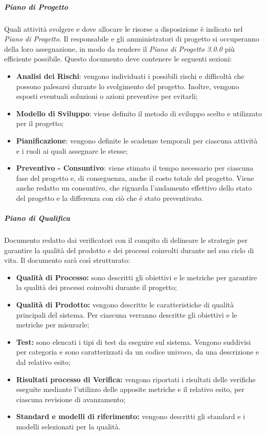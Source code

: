 \subparagraph*{Piano di Progetto\doc}
Quali attività svolgere e dove allocare le risorse a disposizione è indicato nel \textit{Piano di Progetto}\docs. Il responsabile e gli amministratori di progetto si occuperanno della loro assegnazione, in modo da rendere il \textit{Piano di Progetto 3.0.0\doc} più efficiente possibile. Questo documento deve contenere le seguenti sezioni:
\begin{itemize}
	\item \textbf{Analisi dei Rischi}: vengono individuati i possibili rischi e difficoltà che possono palesarsi durante lo svolgimento del progetto. Inoltre, vengono esposti eventuali soluzioni o azioni preventive per evitarli;
	\item \textbf{Modello di Sviluppo}: viene definito il metodo di sviluppo scelto e utilizzato per il progetto;
	\item \textbf{Pianificazione}: vengono definite le scadenze temporali per ciascuna attività e i ruoli ai quali assegnare le stesse;
	\item \textbf{Preventivo - Consuntivo}: viene stimato il tempo necessario per ciascuna fase del progetto e, di conseguenza, anche il costo totale del progetto. Viene anche redatto un consuntivo, che riguarda l'andamento effettivo dello stato del progetto e la differenza con ciò che é stato preventivato.
\end{itemize}
\subparagraph*{Piano di Qualifica}
Documento redatto dai verificatori con il compito di delineare le strategie per garantire la qualità del prodotto e dei processi coinvolti durante nel suo ciclo di vita. Il documento sarà così strutturato:
\begin{itemize}
	\item \textbf{Qualità di Processo:} sono descritti gli obiettivi e le metriche per garantire la qualità dei processi coinvolti durante il progetto;
	\item \textbf{Qualità di Prodotto:} vengono descritte le caratteristiche di qualità principali del sistema. Per ciascuna verranno descritte gli obiettivi e le metriche per misurarle;
	\item \textbf{Test:} sono elencati i tipi di test da eseguire sul sistema. Vengono suddivisi per categoria e sono caratterizzati da un codice univoco, da una descrizione e dal relativo esito;
	\item \textbf{Risultati processo di Verifica:} vengono riportati i risultati delle verifiche eseguite mediante l'utilizzo delle apposite metriche e il relativo esito, per ciascuna revisione di avanzamento;
	\item \textbf{Standard e modelli di riferimento:} vengono descritti gli standard e i modelli selezionati per la qualità.
\end{itemize}

